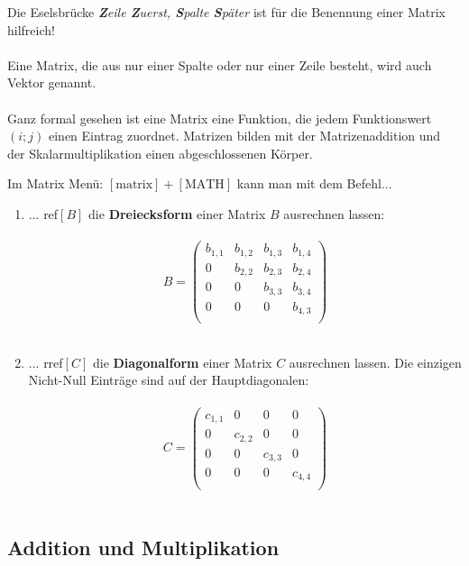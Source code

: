 \documentclass[../MAIN/main.tex]{subfiles}
\begin{document}
\begin{Bemerkung}
Die Eselsbrücke \textit{\textbf{Z}eile \textbf{Z}uerst, \textbf{S}palte \textbf{S}päter} ist für die Benennung einer Matrix hilfreich!\\\\
Eine Matrix, die aus nur einer Spalte oder nur einer Zeile besteht, wird auch Vektor genannt.\\\\
Ganz formal gesehen ist eine Matrix eine Funktion, die jedem Funktionswert $(i;j)$ einen Eintrag zuordnet. Matrizen bilden mit der Matrizenaddition und der Skalarmultiplikation einen abgeschlossenen Körper.
\end{Bemerkung}


\begin{GTR-Tipp}
Im Matrix Menü: $[\text{matrix}] + [\text{MATH}]$ kann man mit dem Befehl...\\
\begin{enumerate}
\item ... ref$[B]$ die \textbf{Dreiecksform} einer Matrix $B$ ausrechnen lassen:\\\\
$$B= \begin{pmatrix}
b_{1,1}&b_{1,2}&b_{1,3}&b_{1,4}\\
0&b_{2,2}&b_{2,3}&b_{2,4}\\
0&0&b_{3,3}&b_{3,4}\\
0&0&0&b_{4,3}\\
\end{pmatrix}$$\\
\item ... rref$[C]$ die \textbf{Diagonalform} einer Matrix $C$ ausrechnen lassen. Die einzigen Nicht-Null Einträge sind auf der Hauptdiagonalen:\\\\
$$C= \begin{pmatrix}
c_{1,1}&0&0&0\\
0&c_{2,2}&0&0\\
0&0&c_{3,3}&0\\
0&0&0&c_{4,4}\\
\end{pmatrix}$$\\
\end{enumerate}
\end{GTR-Tipp}


\subsection{Addition und Multiplikation}
\end{document}
